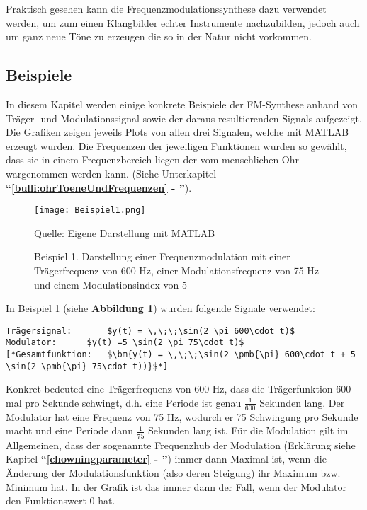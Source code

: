 Praktisch gesehen kann die Frequenzmodulationssynthese dazu verwendet werden, um zum einen Klangbilder echter Instrumente nachzubilden, jedoch auch um ganz neue Töne zu erzeugen die so in der Natur nicht vorkommen.

\FloatBarrier
\subsection{Beispiele}
In diesem Kapitel werden einige konkrete Beispiele der FM-Synthese anhand von Träger- und Modulationssignal sowie der daraus resultierenden Signals aufgezeigt. Die Grafiken zeigen jeweils Plots von allen drei Signalen, welche mit MATLAB erzeugt wurden.
Die Frequenzen der jeweiligen Funktionen wurden so gewählt, dass sie in einem Frequenzbereich liegen der vom menschlichen Ohr wargenommen werden kann. (Siehe Unterkapitel \textbf{``\ref{bulli:ohrToeneUndFrequenzen} - ''}).

\begin{figure} [ht]
\centering
  \texttt{[image: Beispiel1.png]}
\caption{Beispiel 1. Darstellung einer Frequenzmodulation mit einer Trägerfrequenz von 600 Hz, einer Modulationsfrequenz von 75 Hz und einem Modulationsindex von 5 }
\label{fig:beispiel1}
Quelle: Eigene Darstellung mit MATLAB
\end{figure}

In Beispiel 1 (siehe \textbf{Abbildung \ref{fig:beispiel1}})  wurden folgende Signale verwendet:

\begin{lstlisting}[mathescape]
Trägersignal: 		$y(t) = \,\;\;\sin(2 \pi 600\cdot t)$
Modulator:		$y(t) =5 \sin(2 \pi 75\cdot t)$
[*Gesamtfunktion: 	$\bm{y(t) = \,\;\;\sin(2 \pmb{\pi} 600\cdot t + 5 \sin(2 \pmb{\pi} 75\cdot t))}$*]
\end{lstlisting}

Konkret bedeuted eine Trägerfrequenz von 600 Hz, dass die Trägerfunktion 600 mal pro Sekunde schwingt, d.h. eine Periode ist genau $\frac{1}{600}$ Sekunden lang. Der Modulator hat eine Frequenz von 75 Hz, wodurch er 75 Schwingung pro Sekunde macht und eine Periode dann $\frac{1}{75}$ Sekunden lang ist. Für die Modulation gilt im Allgemeinen, dass der sogenannte Frequenzhub der Modulation (Erklärung siehe Kapitel \textbf{``\ref{chowningparameter} - ''}) immer dann Maximal ist, wenn die Änderung der Modulationsfunktion (also deren Steigung) ihr Maximum bzw. Minimum hat. In der Grafik ist das immer dann der Fall, wenn der Modulator den Funktionswert 0 hat.

